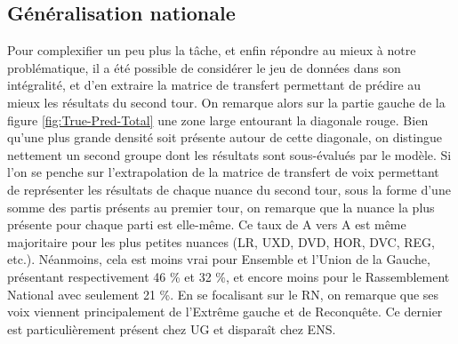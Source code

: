 \documentclass[11pt]{article}
\begin{document}
        \subsection*{Généralisation nationale}
            
            Pour complexifier un peu plus la tâche, et enfin répondre au mieux à notre problématique, il a été possible de considérer le jeu de données dans son intégralité, et d'en extraire la matrice de transfert permettant de prédire au mieux les résultats du second tour. On remarque alors sur la partie gauche de la figure \ref{fig:True-Pred-Total} une zone large entourant la diagonale rouge. Bien qu'une plus grande densité soit présente autour de cette diagonale, on distingue nettement un second groupe dont les résultats sont sous-évalués par le modèle. Si l’on se penche sur l'extrapolation de la matrice de transfert de voix permettant de représenter les résultats de chaque nuance du second tour, sous la forme d'une somme des partis présents au premier tour, on remarque que la nuance la plus présente pour chaque parti est elle-même. Ce taux de A vers A est même majoritaire pour les plus petites nuances (LR, UXD, DVD, HOR, DVC, REG, etc.). Néanmoins, cela est moins vrai pour Ensemble et l'Union de la Gauche, présentant respectivement 46 \% et 32 \%, et encore moins pour le Rassemblement National avec seulement 21 \%. En se focalisant sur le RN, on remarque que ses voix viennent principalement de l'Extrême gauche et de Reconquête. Ce dernier est particulièrement présent chez UG et disparaît chez ENS.
\end{document}
